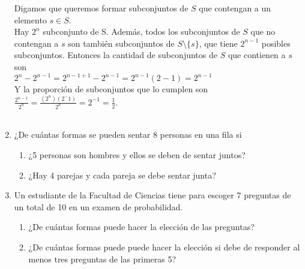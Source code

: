 \documentclass[12pt,a4paper]{report}
\begin{document}
\begin{enumerate}
{		Digamos que queremos formar subconjuntos de $S$ que contengan a un elemento
		$s \in S$.\\
		Hay $2^n$ subconjunto de S. Además, todos los subconjuntos de $S$ que no
		contengan a $s$ son también subconjuntos de $S \setminus \{s\}$, que tiene $2^{n-1}$
		posibles subconjuntos. Entonces la cantidad de subconjuntos de $S$ que
		contienen a $s$ son\\
		$2^n - 2^{n-1} = 2^{n - 1 + 1} - 2^{n-1} = 2^{n-1}(2 - 1) = 2^{n-1}$\\
		Y la proporción de subconjuntos que lo cumplen son\\
		 $\frac{2^{n-1}}{2^n}	= \frac{(2^n) (2^-1)}{2^n} = 2^{-1} = \frac{1}{2}$.\\\\
	}

   \item {
    ¿De cuántas formas se pueden sentar 8 personas en una fila si\\

	\begin{enumerate}
   \item {
   ¿5 personas son hombres y ellos se deben de sentar juntos?\\

   }

   \item {
   ¿Hay 4 parejas y cada pareja se debe sentar junta?\\

   }

	\end{enumerate}

    }

   \item {
    Un estudiante de la Facultad de Ciencias tiene para escoger 7 preguntas
    de un total de 10 en un examen de probabilidad.\\

	\begin{enumerate}
   \item {
   ¿De cuántas formas puede hacer la elección de las preguntas?\\

   }

   \item {
   ¿De cuántas formas puede puede hacer la elección si debe de responder
   al menos tres preguntas de las primeras 5?\\

   }
	\end{enumerate}
    }
\end{enumerate}
\end{document}
